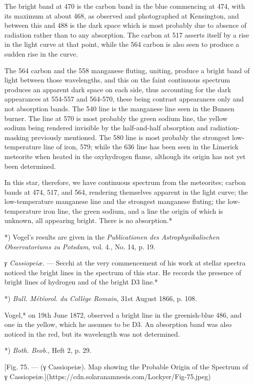 \documentclass[a4paper, 12pt, oneside, polutonikogreek, english]{article}
\begin{document}
The bright band at 470 is the carbon band in the blue commencing at 474, with its maximum at about 468, as observed and photographed at Kensington, and between this and 488 is the dark space which is most probably due to absence of radiation rather than to any absorption. The carbon at 517 asserts itself by a rise in the light curve at that point, while the 564 carbon is also seen to produce a sudden rise in the curve.

The 564 carbon and the 558 manganese fluting, uniting, produce a bright band of light between those wavelengths, and this on the faint continuous spectrum produces an apparent dark space on each side, thus accounting for the dark appearances at 554-557 and 564-570, these being contrast appearances only and not absorption bands. The 540 line is the manganese line seen in the Bunsen burner. The line at 570 is most probably the green sodium line, the yellow sodium being rendered invisible by the half-and-half absorption and radiation-masking previously mentioned. The 580 line is most probably the strongest low-temperature line of iron, 579; while the 636 line has been seen in the Limerick meteorite when heated in the oxyhydrogen flame, although its origin has not yet been determined.

In this star, therefore, we have continuous spectrum from the meteorites; carbon bands at 474, 517, and 564, rendering themselves apparent in the light curve; the low-temperature manganese line and the strongest manganese fluting; the low-temperature iron line, the green sodium, and a line the origin of which is unknown, all appearing bright. There is no absorption.*

*) Vogel's results are given in the \emph{Publicationen des Astrophysikalischen Observatoriums zu Potsdam}, vol. 4., No. 14, p. 19.


\emph{γ Cassiopeiæ.} --- Secchi at the very commencement of his work at stellar spectra noticed the bright lines in the spectrum of this star. He records the presence of bright lines of hydrogen and of the bright D3 line.*

*) \emph{Bull. Météorol. du Collège Romain}, 31st August 1866, p. 108.

Vogel,* on 19th June 1872, observed a bright line in the greenish-blue 486, and one in the yellow, which he assumes to be D3. An absorption band was also noticed in the red, but its wavelength was not determined.

*) \emph{Both. Beob.}, Heft 2, p. 29.

[Fig. 75. --- (γ Cassiopeiæ). Map showing the Probable Origin of the Spectrum of γ Cassiopeiæ.](https://cdn.solaranamnesis.com/Lockyer/Fig-75.jpeg)
\end{document}
